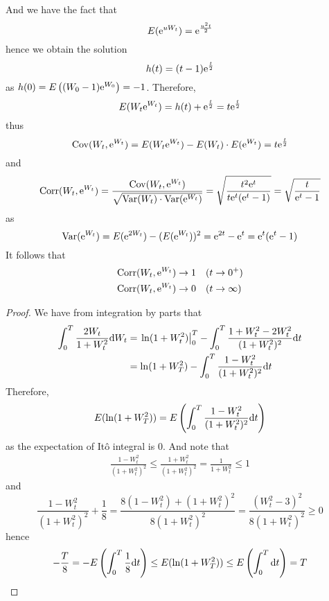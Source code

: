 \documentclass{homework}
\begin{document}
    And we have the fact that
    \[E(\mathrm e^{uW_t})=\mathrm e^{\frac{u^2t}2}\]
    hence we obtain the solution
    \[h(t)=(t-1)\mathrm e^{\frac{t}{2}}\]
    as $h(0)=E\left((W_0-1)\mathrm e^{W_0}\right)=-1$.
    Therefore,
    \[E(W_t\mathrm e^{W_t})=h(t)+\mathrm e^{\frac{t}{2}}=t\mathrm e^{\frac{t}{2}}\]
    thus
    \def\cov{\mathrm{Cov}}
    \def\var{\mathrm{Var}}
    \def\corr{\mathrm{Corr}}
    \[\cov(W_t,\e^{W_t})=E(W_t\e^{W_t})-E(W_t)\cdot E(\e^{W_t})
    =t\e^{\frac{t}{2}}\]
    and
    \[\corr(W_t,\e^{W_t})=\frac{\cov(W_t,\e^{W_t})}%
    {\sqrt{\var(W_t)\cdot\var(\e^{W_t})}}
    =\sqrt{\frac{t^2\e^t}{t\e^t(\e^t-1)}}
    =\sqrt{\frac{t}{\e^t-1}}\]
    as
    \[\var(\e^{W_t})=E(\e^{2W_t})-(E(\e^{W_t}))^2
    =\e^{2t}-\e^t=
    \e^t(\e^t-1)\]
    It follows that
    \[\begin{aligned}
        \corr(W_t,\e^{W_t})&\to 1\quad(t\to 0^+)\\
        \corr(W_t,\e^{W_t})&\to 0\quad(t\to \infty)
    \end{aligned}\]

    \problem
    \begin{proof}
        We have from integration by parts that
        \[\begin{aligned}
            \int_0^T\frac{2W_t}{1+W_t^2}\mathrm d W_t
            &=\left.\ln(1+W_t^2)\right|_0^T
            -\int_0^T\frac{1+W_t^2-2W_t^2}{(1+W_t^2)^2}\mathrm d t\\
            &=\ln(1+W_T^2)-\int_0^T\frac{1-W_t^2}{(1+W_t^2)^2}\mathrm d t
        \end{aligned}\]
        Therefore,
        \[E(\ln(1+W_T^2))=E\left(
            \int_0^T\frac{1-W^2_t}{(1+W_t^2)^2}\mathrm d t
        \right)\]
        as the expectation of It\^o integral is 0.
        And note that
        \[\begin{aligned}
            \frac{1-W_t^2}{(1+W_t^2)^2}\leq\frac{1+W_t^2}{(1+W_t^2)^2}
            =\frac{1}{1+W_t^2}\leq 1
        \end{aligned}\]
        and
        \[\frac{1-W_t^2}{(1+W_t^2)^2}+\frac{1}{8}
        =\frac{8(1-W_t^2)+(1+W_t^2)^2}{8(1+W_t^2)^2}
        =\frac{(W_t^2-3)^2}{8(1+W_t^2)^2}\geq 0\]
        hence
        \[-\frac{T}{8}=-E\left(\int_0^T\frac{1}{8}\mathrm d t\right)
        \leq E(\ln(1+W_T^2))
        \leq E\left(\int_0^T\mathrm d t\right)=T\]

    \end{proof}
\end{document}
